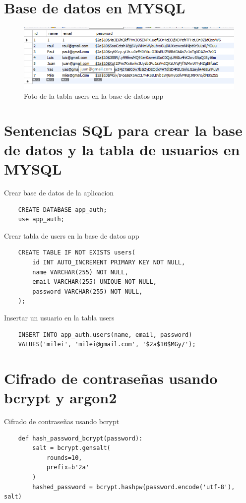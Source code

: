 \documentclass[12pt]{article}
\begin{document}
\section{Base de datos en MYSQL}
\begin{figure}[H]
    \centering
    \includegraphics[width=1\textwidth]{./img/DB-Mysql.png}
    \caption{Foto de la tabla users en la base de datos app}
    \label{fig:my_label}
\end{figure}
\section{Sentencias SQL para crear la base de datos y la tabla de usuarios en MYSQL}

\large{Crear base de datos de la aplicacion}
\begin{verbatim}
    CREATE DATABASE app_auth;
    use app_auth;
\end{verbatim}

\large{Crear tabla de users en la base de datos app}

\begin{verbatim}
    CREATE TABLE IF NOT EXISTS users(
        id INT AUTO_INCREMENT PRIMARY KEY NOT NULL,
        name VARCHAR(255) NOT NULL,
        email VARCHAR(255) UNIQUE NOT NULL,
        password VARCHAR(255) NOT NULL,
    );

\end{verbatim}
\large{Insertar un usuario en la tabla users}
\begin{verbatim}
    INSERT INTO app_auth.users(name, email, password)
    VALUES('milei', 'milei@gmail.com', '$2a$10$MGy/');
\end{verbatim}

\section{Cifrado de contraseñas usando bcrypt y argon2}

\large{Cifrado de contraseñas usando bcrypt}
\begin{verbatim} 
    def hash_password_bcrypt(password):
        salt = bcrypt.gensalt(
            rounds=10,
            prefix=b'2a'
        )
        hashed_password = bcrypt.hashpw(password.encode('utf-8'), salt)
\end{verbatim}
\end{document}
